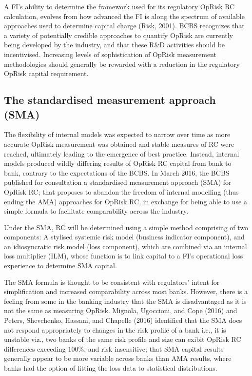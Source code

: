 \documentclass[]{DissertateUSU}
\begin{document}
A FI's ability to determine the framework used for its regulatory OpRisk
RC calculation, evolves from how advanced the FI is along the spectrum
of available approaches used to determine capital charge (Risk, 2001).
BCBS recognizes that a variety of potentially credible approaches to
quantify OpRisk are currently being developed by the industry, and that
these R\&D activities should be incentivised. Increasing levels of
sophistication of OpRisk measurement methodologies should generally be
rewarded with a reduction in the regulatory OpRisk capital requirement.

\subsection{The standardised measurement approach (SMA)}

The flexibility of internal models was expected to narrow over time as
more accurate OpRisk measurement was obtained and stable measures of RC
were reached, ultimately leading to the emergence of best practice.
Instead, internal models produced wildly differing results of OpRisk RC
capital from bank to bank, contrary to the expectations of the BCBS. In
March 2016, the BCBS published for consultation a standardised
measurement approach (SMA) for OpRisk RC; that proposes to abandon the
freedom of internal modelling (thus ending the AMA) approaches for
OpRisk RC, in exchange for being able to use a simple formula to
facilitate comparability across the industry.\medskip

Under the SMA, RC will be determined using a simple method comprising of
two components: A stylised systemic risk model (business indicator
component), and an idiosyncratic risk model (loss component), which are
combined via an internal loss multiplier (ILM), whose function is to
link capital to a FI's operational loss experience to determine SMA
capital.\medskip

The SMA formula is thought to be consistent with regulators' intent for
simplification and increased comparability across most banks. However,
there is a feeling from some in the banking industry that the SMA is
disadvantaged as it is not the same as measuring OpRisk. Mignola,
Ugoccioni, and Cope (2016) and Peters, Shevchenko, Hassani, and Chapelle
(2016) identified that the SMA does not respond appropriately to changes
in the risk profile of a bank i.e., it is unstable viz., two banks of
the same risk profile and size can exibit OpRisk RC differences
exceeding 100\%, and risk insensitive; that SMA capital results
generally appear to be more variable across banks than AMA results,
where banks had the option of fitting the loss data to statistical
distributions.
\end{document}
